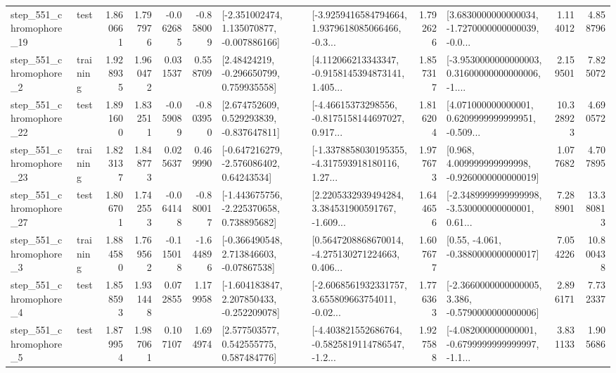 \begin{tabular}{llrrrrllrlrr}
  step\_551\_chromophore\_19 &      test &      1.860661 &    1.797976 &     -0.062685 & -0.858009 &   [-2.351002474, 1.135070877, -0.007886166] &  [-3.9259416584794664, 1.9379618085066466, -0.3... &       1.792626 &  [3.6830000000000034, -1.7270000000000039, -0.0... &            1.114012 &          4.858796 \\
   step\_551\_chromophore\_2 &  training &      1.928935 &    1.960472 &      0.031537 &  0.558709 &     [2.48424219, -0.296650799, 0.759935558] &  [4.112066213343347, -0.9158145394873141, 1.405... &       1.857317 &  [-3.9530000000000003, 0.31600000000000006, -1.... &            2.159501 &          7.825072 \\
  step\_551\_chromophore\_22 &      test &      1.891600 &    1.832511 &     -0.059089 & -0.803950 &    [2.674752609, 0.529293839, -0.837647811] &  [-4.46615373298556, -0.8175158144697027, 0.917... &       1.816204 &  [4.071000000000001, 0.6209999999999951, -0.509... &           10.328923 &          4.690572 \\
  step\_551\_chromophore\_23 &  training &      1.823137 &    1.848773 &      0.025637 &  0.469990 &    [-0.647216279, -2.576086402, 0.64243534] &  [-1.3378858030195355, -4.317593918180116, 1.27... &       1.977673 &    [0.968, 4.009999999999998, -0.9260000000000019] &            1.077682 &          4.707895 \\
  step\_551\_chromophore\_27 &      test &      1.806701 &    1.742553 &     -0.064148 & -0.880017 &   [-1.443675756, -2.225370658, 0.738895682] &  [2.2205332939494284, 3.384531900591767, -1.609... &       1.644656 &  [-2.3489999999999998, -3.530000000000001, 0.61... &            7.288901 &         13.380813 \\
   step\_551\_chromophore\_3 &  training &      1.884580 &    1.769562 &     -0.115018 & -1.644896 &    [-0.366490548, 2.713846603, -0.07867538] &  [0.5647208868670014, -4.275130271224663, 0.406... &       1.607677 &                [0.55, -4.061, -0.3880000000000017] &            7.054226 &         10.800438 \\
   step\_551\_chromophore\_4 &      test &      1.858593 &    1.931448 &      0.072855 &  1.179958 &   [-1.604183847, 2.207850433, -0.252209078] &  [-2.6068561932331757, 3.655809663754011, -0.02... &       1.776363 &  [-2.3660000000000005, 3.386, -0.5790000000000006] &            2.896171 &          7.732337 \\
   step\_551\_chromophore\_5 &      test &      1.879954 &    1.987061 &      0.107107 &  1.694974 &     [2.577503577, 0.542555775, 0.587484776] &  [-4.403821552686764, -0.5825819114786547, -1.2... &       1.927588 &  [-4.082000000000001, -0.6799999999999997, -1.1... &            3.831133 &          1.905686 \\

\end{tabular}
